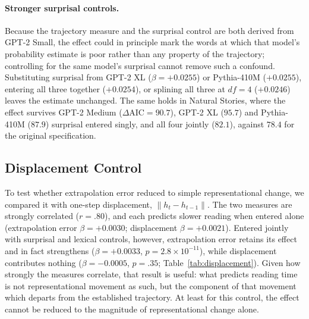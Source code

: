\documentclass[12pt]{article}
\newcommand{\new}[1]{#1}   %
\begin{document}
{\paragraph{Stronger surprisal controls.} Because the trajectory measure and the surprisal control are both derived from GPT-2 Small, the effect could in principle mark the words at which that model's probability estimate is poor rather than any property of the trajectory; controlling for the same model's surprisal cannot remove such a confound. Substituting surprisal from GPT-2 XL ($\beta = +0.0255$) or Pythia-410M ($+0.0255$), entering all three together ($+0.0254$), or splining all three at $df = 4$ ($+0.0246$) leaves the estimate unchanged. The same holds in Natural Stories, where the effect survives GPT-2 Medium ($\Delta\text{AIC} = 90.7$), GPT-2 XL ($95.7$) and Pythia-410M ($87.9$) surprisal entered singly, and all four jointly ($82.1$), against $78.4$ for the original specification.}

\subsection{Displacement Control}

To test whether extrapolation error reduced to simple representational change, we compared it with one-step displacement, $\|h_t - h_{t-1}\|$. \new{The two measures are strongly correlated ($r = .80$), and each predicts slower reading when entered alone (extrapolation error $\beta = +0.0030$; displacement $\beta = +0.0021$). Entered jointly with surprisal and lexical controls, however, extrapolation error retains its effect and in fact strengthens ($\beta = +0.0033$, $p = 2.8 \times 10^{-11}$), while displacement contributes nothing ($\beta = -0.0005$, $p = .35$; Table~\ref{tab:displacement}). Given how strongly the measures correlate, that result is useful: what predicts reading time is not representational movement as such, but the component of that movement which departs from the established trajectory. At least for this control, the effect cannot be reduced to the magnitude of representational change alone.}
\end{document}
